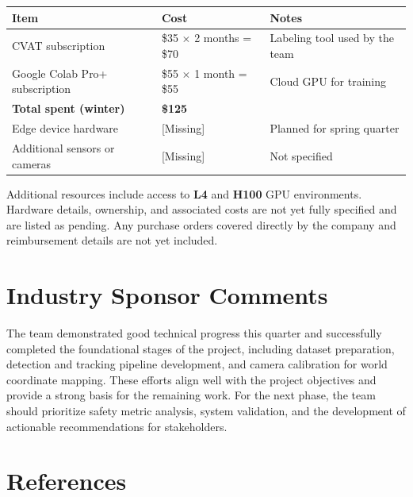 \documentclass[12pt,letterpaper]{article}
\begin{document}
\begin{tabular}{|p{5cm}|p{4cm}|p{5cm}|}
\hline
\textbf{Item} & \textbf{Cost} & \textbf{Notes} \\
\hline
CVAT subscription & \$35 $\times$ 2 months = \$70 & Labeling tool used by the team \\
\hline
Google Colab Pro+ subscription & \$55 $\times$ 1 month = \$55 & Cloud GPU for training \\
\hline
\textbf{Total spent (winter)} & \textbf{\$125} & \\
\hline
Edge device hardware & [Missing] & Planned for spring quarter \\
\hline
Additional sensors or cameras & [Missing] & Not specified \\
\hline
\end{tabular}

\vspace{0.5em}
Additional resources include access to \textbf{L4} and \textbf{H100} GPU environments. Hardware details, ownership, and associated costs are not yet fully specified and are listed as pending. Any purchase orders covered directly by the company and reimbursement details are not yet included.~\cite{report-guide}

\section{Industry Sponsor Comments}

The team demonstrated good technical progress this quarter and successfully completed the foundational stages of the project, including dataset preparation, detection and tracking pipeline development, and camera calibration for world coordinate mapping. These efforts align well with the project objectives and provide a strong basis for the remaining work. For the next phase, the team should prioritize safety metric analysis, system validation, and the development of actionable recommendations for stakeholders.

\section{References}
\end{document}
